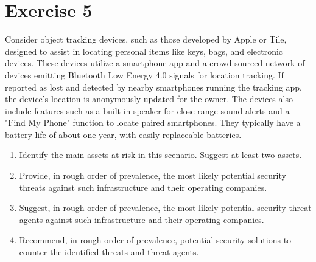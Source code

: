 \section{Exercise 5}

Consider object tracking devices, such as those developed by Apple or Tile, designed to assist in locating personal items like keys, bags, and electronic devices. 
These devices utilize a smartphone app and a crowd sourced network of devices emitting Bluetooth Low Energy 4.0 signals for location tracking. 
If reported as lost and detected by nearby smartphones running the tracking app, the device's location is anonymously updated for the owner. 
The devices also include features such as a built-in speaker for close-range sound alerts and a "Find My Phone" function to locate paired smartphones. 
They typically have a battery life of about one year, with easily replaceable batteries.
\begin{enumerate}
    \item Identify the main assets at risk in this scenario. Suggest at least two assets.
    \item Provide, in rough order of prevalence, the most likely potential security threats against such infrastructure and their operating companies.
    \item Suggest, in rough order of prevalence, the most likely potential security threat agents against such infrastructure and their operating companies.
    \item Recommend, in rough order of prevalence, potential security solutions to counter the identified threats and threat agents.
\end{enumerate}

